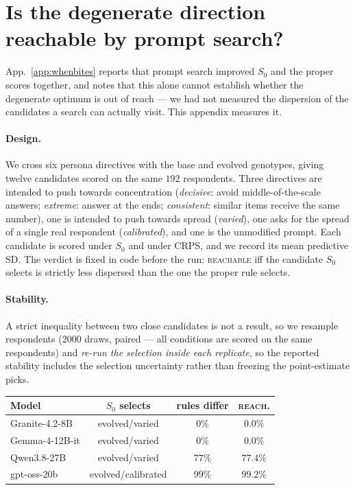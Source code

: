 \documentclass[11pt]{article}
\begin{document}
\section{Is the degenerate direction reachable by prompt search?}
\label{app:reach}

App.~\ref{app:whenbites} reports that prompt search improved $S_0$ and the
proper scores together, and notes that this alone cannot establish whether the
degenerate optimum is out of reach --- we had not measured the dispersion of the
candidates a search can actually visit. This appendix measures it.

\paragraph{Design.} We cross six persona directives with the base and evolved
genotypes, giving twelve candidates scored on the same $192$ respondents.
Three directives are intended to push towards concentration (\textit{decisive}: avoid
middle-of-the-scale answers; \textit{extreme}: answer at the ends;
\textit{consistent}: similar items receive the same number), one is intended to push towards
spread (\textit{varied}), one asks for the spread of a single real respondent
(\textit{calibrated}), and one is the unmodified prompt. Each candidate is
scored under $S_0$ and under CRPS, and we record its mean predictive SD. The
verdict is fixed in code before the run: \textsc{reachable} iff the candidate
$S_0$ selects is strictly less dispersed than the one the proper rule selects.

\paragraph{Stability.} A strict inequality between two close candidates is not a
result, so we resample respondents ($2000$ draws, paired --- all conditions are
scored on the same respondents) and \emph{re-run the selection inside each
replicate}, so the reported stability includes the selection uncertainty rather
than freezing the point-estimate picks.

\begin{center}\scriptsize
\setlength{\tabcolsep}{3pt}
\begin{tabular}{lccc}
\toprule
Model & $S_0$ selects & rules differ & \textsc{reach.}\\
\midrule
Granite-4.2-8B & evolved/varied & $0\%$ & $0.0\%$\\
Gemma-4-12B-it & evolved/varied & $0\%$ & $0.0\%$\\
Qwen3.8-27B & evolved/varied & $77\%$ & $77.4\%$\\
gpt-oss-20b & evolved/calibrated & $99\%$ & $\mathbf{99.2\%}$\\
\bottomrule
\end{tabular}
\end{center}
\end{document}
